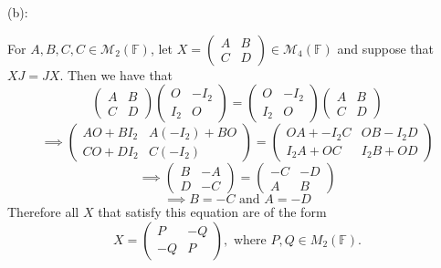 \documentclass{article}
\theoremstyle{plain} %
\numberwithin{thm}{section} %
\theoremstyle{definition}
\begin{document}
\begin{question}{10}
        \medskip

        (b):

        For \(A,B,C,C \in \mathcal{M}_2(\mathbb{F})\), let \(X = \left( \begin{array}{c|c} A & B \\ \hline C & D \end{array} \right) \in \mathcal{M} _4 (\mathbb{F})\) and suppose that \(XJ = JX\). Then we have that
        \[
            \left( \begin{array}{c|c} A & B \\ \hline C & D \end{array} \right) \left( \begin{array}{c|c} O & -I_2 \\ \hline I_2 & O \end{array} \right) = \left( \begin{array}{c|c} O & -I_2 \\ \hline I_2 & O \end{array} \right) \left( \begin{array}{c|c} A & B \\ \hline C & D \end{array} \right)
        \]
        \[
            \implies \left( \begin{array}{c|c} AO + BI_2 & A(-I_2) + BO \\ \hline CO + DI_2 & C(-I_2) \end{array} \right) = \left( \begin{array}{c|c} OA + -I_2 C & OB - I_2 D \\ \hline I_2 A + OC & I_2 B + OD \end{array} \right)
        \]
        \[
            \implies \left( \begin{array}{c|c} B & -A \\ \hline D & -C \end{array} \right) = \left( \begin{array}{c|c} -C & -D \\ \hline A & B \end{array} \right)
        \]
        \[
            \implies B = -C \text{ and } A = -D
        \]
        Therefore all \(X\) that satisfy this equation are of the form
        \[
            X = \left( \begin{array}{c|c} P & -Q \\ \hline -Q & P \end{array} \right), \text{ where } P,Q \in M_2(\mathbb{F}).
        \]


\end{question}
\end{document}
